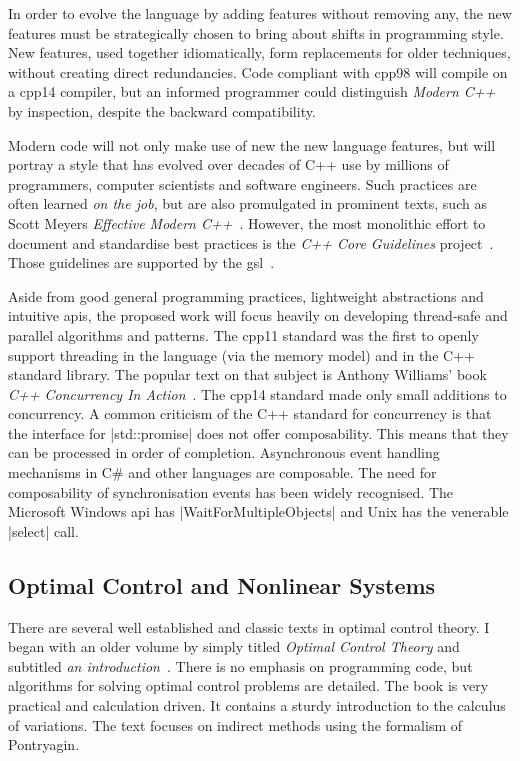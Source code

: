 In order to evolve the language by adding features without removing any, the new
features must be strategically chosen to bring about shifts in programming
style. New features, used together idiomatically, form replacements for older
techniques, without creating direct redundancies. Code compliant with \ac{cpp98}
will compile on a \ac{cpp14} compiler, but an informed programmer could
distinguish \emph{Modern C++} by inspection, despite the backward compatibility.

Modern code will not only make use of new the new language features, but will
portray a style that has evolved over decades of C++ use by millions of
programmers, computer scientists and software engineers. Such practices are
often learned \emph{on the job}, but are also promulgated in prominent texts,
such as Scott Meyers \emph{Effective Modern C++}~\cite{meyers2014effective}.
However, the most monolithic effort to document and standardise best practices
is the \emph{C++ Core Guidelines} project~\cite{CppCoreGuidelines}. Those
guidelines are supported by the \acl{gsl}~\cite{cppgsl}.

Aside from good general programming practices, lightweight abstractions and
intuitive \acp{api}, the proposed work will focus heavily on developing
thread-safe and parallel algorithms and patterns. The \ac{cpp11} standard was
the first to openly support threading in the language (via the memory model) and
in the C++ standard library. The popular text on that subject is Anthony
Williams' book \emph{C++ Concurrency In Action}~\cite{Williams2012}. The
\ac{cpp14} standard made only small additions to concurrency. A common criticism of
the C++ standard for concurrency is that the interface for |std::promise| does
not offer composability. This means that they can be processed in order of
completion. Asynchronous event handling mechanisms in C\# and other languages
are composable. The need for composability of synchronisation events has been
widely recognised. The Microsoft Windows \ac{api} has |WaitForMultipleObjects|
and Unix has the venerable |select| call.



\subsection{Optimal Control and Nonlinear Systems}


There are several well established and classic texts in optimal control theory.
I began with an older volume by \citeauthor{Kirk2004} simply titled
\emph{Optimal Control Theory} and subtitled \emph{an
introduction}~\cite{Kirk2004}. There is no emphasis on programming code, but
algorithms for solving optimal control problems are detailed. The book is very
practical and calculation driven. It contains a sturdy introduction to the
calculus of variations. The text focuses on indirect methods using the formalism
of Pontryagin.


